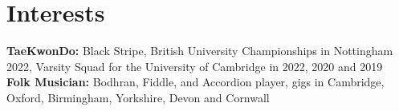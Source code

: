 \documentclass{article}
\begin{document}
\section*{Interests}
\textbf{TaeKwonDo:} Black Stripe, British University Championships in Nottingham 2022, Varsity Squad for the University of Cambridge in 2022, 2020 and 2019\\
\textbf{Folk Musician:} Bodhran, Fiddle, and Accordion %
player, gigs in Cambridge, Oxford, Birmingham, Yorkshire, Devon and Cornwall \\ %

\end{document}
